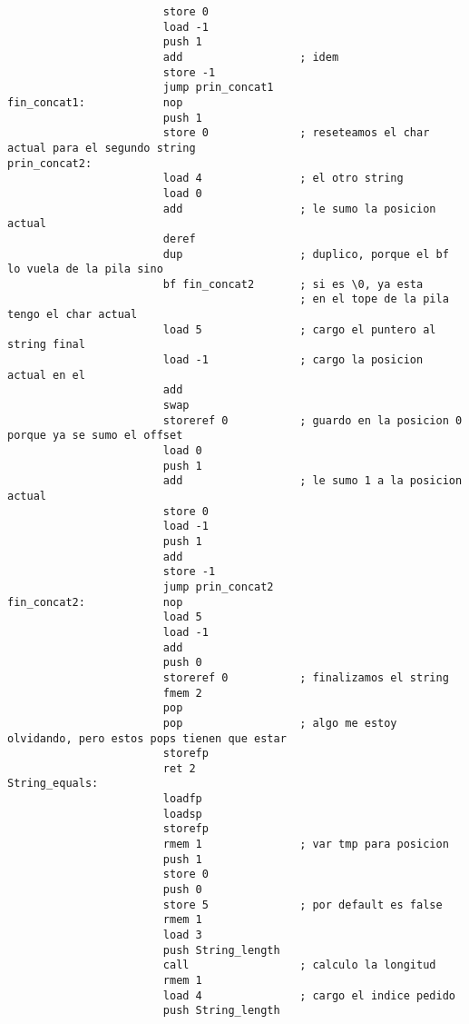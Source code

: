 \documentclass [a4paper,abstracton,titlepage]{scrartcl}
\begin{document}
\begin{lstlisting}
                        store 0
                        load -1
                        push 1
                        add                  ; idem
                        store -1
                        jump prin_concat1
fin_concat1:            nop
                        push 1
                        store 0              ; reseteamos el char actual para el segundo string
prin_concat2:          
                        load 4               ; el otro string
                        load 0
                        add                  ; le sumo la posicion actual
                        deref
                        dup                  ; duplico, porque el bf lo vuela de la pila sino
                        bf fin_concat2       ; si es \0, ya esta
                                             ; en el tope de la pila tengo el char actual
                        load 5               ; cargo el puntero al string final
                        load -1              ; cargo la posicion actual en el
                        add
                        swap
                        storeref 0           ; guardo en la posicion 0 porque ya se sumo el offset
                        load 0
                        push 1
                        add                  ; le sumo 1 a la posicion actual
                        store 0
                        load -1
                        push 1
                        add
                        store -1
                        jump prin_concat2
fin_concat2:            nop
                        load 5
                        load -1
                        add
                        push 0
                        storeref 0           ; finalizamos el string
                        fmem 2
                        pop
                        pop                  ; algo me estoy olvidando, pero estos pops tienen que estar
                        storefp
                        ret 2
String_equals:         
                        loadfp
                        loadsp
                        storefp
                        rmem 1               ; var tmp para posicion
                        push 1
                        store 0
                        push 0
                        store 5              ; por default es false
                        rmem 1
                        load 3
                        push String_length
                        call                 ; calculo la longitud
                        rmem 1
                        load 4               ; cargo el indice pedido
                        push String_length

\end{lstlisting}
\end{document}
